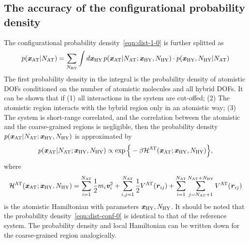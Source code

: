 \documentclass[epjST]{svjour}
\newcommand{\vect}[1]{\textbf{\textit{#1}}}
\newcommand{\mh}[0]{\mathcal {H}}
\newcommand{\AT}[0]{\textrm{AT}}
\newcommand{\HY}[0]{\textrm{HY}}
\begin{document}
\subsection{The accuracy of the configurational probability density}
The configurational probability density~\eqref{eqn:dist-1-0} is further splitted as
\begin{align}\label{eqn:conf-split}
  p(\vect x_\AT \vert N_\AT) =
  \sum_{N_\HY} \int {d}\vect x_\HY\,
  p(\vect x_\AT \vert N_\AT; \vect x_\HY, N_\HY)\cdot
  p(\vect x_\HY, N_\HY\vert N_\AT)  
\end{align}
The first probability density in the integral is the probability density
of atomistic DOFs conditioned on the number of atomistic molecules and all
hybrid DOFs.
It can be shown that if
(1) all interactions in the system are cut-offed;
(2) The atomistic region interacts with the bybrid region only in an atomistic way;
(3) The system is short-range correlated, and the correlation between the atomistic
and the coarse-grained regions is negligible, then the probability density $p(\vect x_\AT \vert N_\AT; \vect x_\HY, N_\HY)$
is approximated by
\begin{align}\label{eqn:dist-conf-0}
  p(\vect x_\AT \vert N_\AT; \vect x_\HY, N_\HY)
  \propto
  \exp\Big\{-\beta \mh^\AT(\vect x_\AT; \vect x_\HY, N_\HY) \Big\},
\end{align}
where 
\begin{align}
  \mh^\AT(\vect x_\AT; \vect x_\HY, N_\HY)
  =
  \sum_{i=1}^{N_\AT}\frac12 m_i\vect v_i^2 +
  \sum_{i,j=1}^{N_\AT} \frac12 V^\AT(\vect r_{ij}) +
  \sum_{i=1}^{N_\AT}\sum_{j=N_\AT+1}^{N_\AT + N_\HY} V^\AT(\vect r_{ij})
\end{align}
is the atomistic Hamiltonian with parameters $\vect x_\HY, N_\HY$. It
should be noted that the probability density~\eqref{eqn:dist-conf-0}
is identical to that of the reference system.
The probability density and local Hamiltonian
can be written down for the coarse-grained region analogically.
\end{document}
